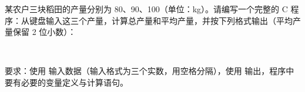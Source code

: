 \documentclass[a4paper,11pt]{article}
\begin{document}
\newpage
{}

\q 某农户三块稻田的产量分别为 80、90、100（单位：kg）。请编写一个完整的 C 程序：从键盘输入这三个产量，计算总产量和平均产量，并按下列格式输出（平均产量保留 2 位小数）：
\par\vspace{0.15em}
\noindent\hspace{2em}\\
\noindent\hspace{2em}

\noindent 要求：使用  输入数据（输入格式为三个实数，用空格分隔），使用  输出，程序中要有必要的变量定义与计算语句。\anslines{4.0cm}
\end{document}

